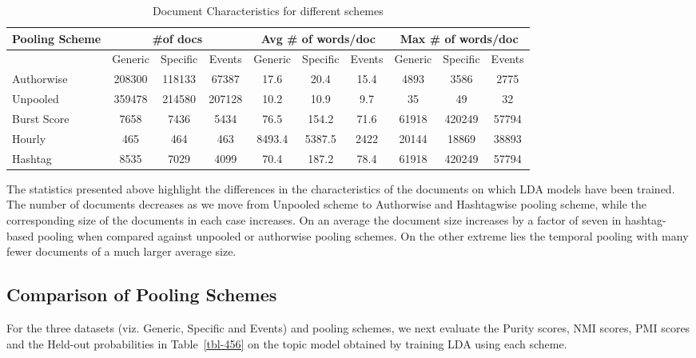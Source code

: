 \documentclass{sig-alternate}
\begin{document}
{
\begin{table*}%
\centering
\caption{Document Characteristics for different schemes}\label{tbl-3}
\resizebox{14cm}{!} 
{
	\begin{tabular}{|l|ccc|ccc|ccc|}
	\hline
	Pooling Scheme  & \multicolumn {3}{c|}{\#of docs} & \multicolumn {3}{c|}{Avg \# of words/doc} & \multicolumn {3}{c|}{Max \# of words/doc}\\
	\hline
	 & Generic & Specific & Events &  Generic & Specific & Events &  Generic & Specific & Events\\
	\hline
	Authorwise & 208300 & 118133 & 67387 & 17.6 & 20.4 & 15.4 & 4893 & 3586 & 2775 \\
	\hline
	Unpooled & 359478 & 214580 & 207128 & 10.2 & 10.9 & 9.7 & 35 & 49 & 32 \\
	\hline
	Burst Score & 7658 & 7436 & 5434 & 76.5 & 154.2 & 71.6 & 61918 & 420249 & 57794 \\
	\hline
	Hourly & 465 & 464 & 463 & 8493.4 & 5387.5 & 2422 & 20144 & 18869 & 38893 \\
	\hline
	Hashtag & 8535 & 7029 & 4099 & 70.4 & 187.2 & 78.4 & 61918 & 420249 & 57794 \\
	\hline
	\end{tabular}
}\vspace*{-6pt}
\end{table*}
}

The statistics presented above highlight the differences in the
characteristics of the documents on which LDA models have been
trained. The number of documents decreases as we move from Unpooled
scheme to Authorwise and Hashtagwise pooling scheme, while the
corresponding size of the documents in each case increases. On an
average the document size increases by a factor of seven in
hashtag-based pooling when compared against unpooled or authorwise
pooling schemes. On the other extreme lies the temporal pooling with
many fewer documents of a much larger average size.

\subsection{Comparison of Pooling Schemes}

For the three datasets (viz. Generic, Specific and Events) and pooling
schemes, we next evaluate the Purity scores, NMI scores, PMI scores
and the Held-out probabilities in Table~\ref{tbl-456} on the topic
model obtained by training LDA using each scheme.
\end{document}
